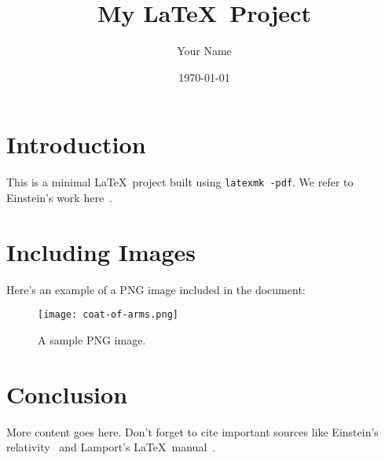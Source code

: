 \documentclass[a4paper,12pt]{article}
\title{My \LaTeX~Project}
\author{Your Name}
\date{\today}
\begin{document}
\maketitle

\tableofcontents
\newpage

\section{Introduction}
This is a minimal \LaTeX~project built using \texttt{latexmk -pdf}.  We refer to
Einstein's work here~\cite{einstein}.

\section{Including Images}

Here’s an example of a PNG image included in the document:

\begin{figure}[h]
    \centering
    \texttt{[image: coat-of-arms.png]}
    \caption{A sample PNG image.}
    \label{fig:pngimage}
\end{figure}

\section{Conclusion}
More content goes here. Don't forget to cite important sources like Einstein's
relativity~\cite{einstein} and Lamport's \LaTeX~manual~\cite{latex}.

\newpage


\end{document}
